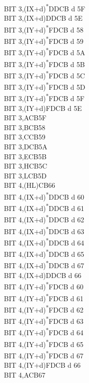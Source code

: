 \documentclass[oneside,a4paper]{book}
\begin{document}
\begin{multicols}{3}
{\begin{tabbing}
BIT 3,(IX+d)\textsuperscript{*}\>DDCB d 5F\\
BIT 3,(IX+d)\>DDCB d 5E\\
BIT 3,(IY+d)\textsuperscript{*}\>FDCB d 58\\
BIT 3,(IY+d)\textsuperscript{*}\>FDCB d 59\\
BIT 3,(IY+d)\textsuperscript{*}\>FDCB d 5A\\
BIT 3,(IY+d)\textsuperscript{*}\>FDCB d 5B\\
BIT 3,(IY+d)\textsuperscript{*}\>FDCB d 5C\\
BIT 3,(IY+d)\textsuperscript{*}\>FDCB d 5D\\
BIT 3,(IY+d)\textsuperscript{*}\>FDCB d 5F\\
BIT 3,(IY+d)\>FDCB d 5E\\
BIT 3,A\>CB5F\\
BIT 3,B\>CB58\\
BIT 3,C\>CB59\\
BIT 3,D\>CB5A\\
BIT 3,E\>CB5B\\
BIT 3,H\>CB5C\\
BIT 3,L\>CB5D\\
BIT 4,(HL)\>CB66\\
BIT 4,(IX+d)\textsuperscript{*}\>DDCB d 60\\
BIT 4,(IX+d)\textsuperscript{*}\>DDCB d 61\\
BIT 4,(IX+d)\textsuperscript{*}\>DDCB d 62\\
BIT 4,(IX+d)\textsuperscript{*}\>DDCB d 63\\
BIT 4,(IX+d)\textsuperscript{*}\>DDCB d 64\\
BIT 4,(IX+d)\textsuperscript{*}\>DDCB d 65\\
BIT 4,(IX+d)\textsuperscript{*}\>DDCB d 67\\
BIT 4,(IX+d)\>DDCB d 66\\
BIT 4,(IY+d)\textsuperscript{*}\>FDCB d 60\\
BIT 4,(IY+d)\textsuperscript{*}\>FDCB d 61\\
BIT 4,(IY+d)\textsuperscript{*}\>FDCB d 62\\
BIT 4,(IY+d)\textsuperscript{*}\>FDCB d 63\\
BIT 4,(IY+d)\textsuperscript{*}\>FDCB d 64\\
BIT 4,(IY+d)\textsuperscript{*}\>FDCB d 65\\
BIT 4,(IY+d)\textsuperscript{*}\>FDCB d 67\\
BIT 4,(IY+d)\>FDCB d 66\\
BIT 4,A\>CB67\\

\end{tabbing}}
\end{multicols}
\end{document}
